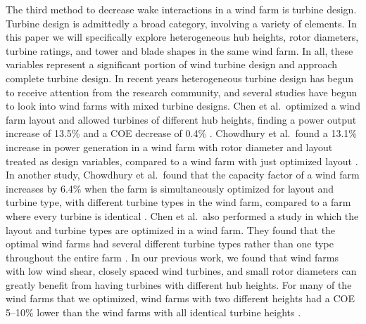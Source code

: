 \documentclass[wes, manuscript]{copernicus}
\begin{document}
The third method to decrease wake interactions in a wind farm is turbine design. Turbine design is admittedly a broad category, involving a variety of elements. In this paper we will specifically explore heterogeneous hub heights, rotor diameters, turbine ratings, and tower and blade shapes in the same wind farm. In all, these variables represent a significant portion of wind turbine design and approach complete turbine design. 
In recent years heterogeneous turbine design has begun to receive attention from the research community, and several studies have begun to look into wind farms with mixed turbine designs. Chen et al.~optimized
a wind farm layout and allowed turbines of different hub heights, finding a power output increase of 13.5\% and a COE decrease of 0.4\% \citep{chen2013wind}. Chowdhury et al.~found
a 13.1\% increase in power generation in a wind farm with rotor diameter and layout treated as design variables, compared to a wind farm with just optimized layout \citep{chowdhury2010optimizing}. In another study, Chowdhury et al.~found that the capacity factor of a wind farm increases by 6.4\% when the farm is simultaneously optimized for layout and turbine type, with different turbine types in the wind farm, compared to a farm where every turbine is identical \citep{chowdhury2013optimizing}. Chen et al.~also performed a study in which the layout and turbine types are optimized in a wind farm. They found that the optimal wind farms had several different turbine types rather than one type throughout the entire farm \citep{chen2015multi}. In our previous work, we found that wind farms with low wind shear, closely spaced wind turbines, and small rotor diameters can greatly benefit from having turbines with different hub heights. For many of the wind farms that we optimized, wind farms with two different heights had a COE 5--10\% lower than the wind farms with all identical turbine heights \citep{stanley2018}.
\end{document}
